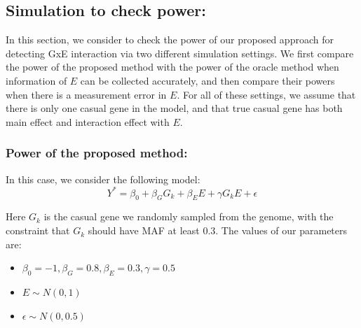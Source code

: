 \documentclass[
]{article}
\providecommand{\tightlist}{%
  \setlength{\itemsep}{0pt}\setlength{\parskip}{0pt}}
\begin{document}
\clearpage

\hypertarget{simulation-to-check-power}{%
\subsection{Simulation to check
power:}\label{simulation-to-check-power}}

In this section, we consider to check the power of our proposed approach
for detecting GxE interaction via two different simulation settings. We
first compare the power of the proposed method with the power of the
oracle method when information of \(E\) can be collected accurately, and
then compare their powers when there is a measurement error in \(E\).
For all of these settings, we assume that there is only one casual gene
in the model, and that true casual gene has both main effect and
interaction effect with \(E\).

\hypertarget{power-of-the-proposed-method}{%
\subsubsection{Power of the proposed
method:}\label{power-of-the-proposed-method}}

In this case, we consider the following model:
\[Y^* = \beta_0 + \beta_GG_k + \beta_EE+\gamma G_kE + \epsilon\]

Here \(G_k\) is the casual gene we randomly sampled from the genome,
with the constraint that \(G_k\) should have MAF at least 0.3. The
values of our parameters are:

\begin{itemize}
\tightlist
\item
  \(\beta_0= -1, \beta_G=0.8, \beta_E= 0.3,\gamma=0.5\)
\item
  \(E \sim N(0,1)\)
\item
  \(\epsilon \sim N(0,0.5)\)
\end{itemize}
\end{document}
